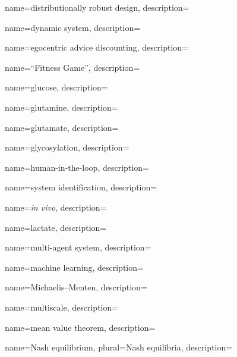 	{
		name={distributionally robust design},
		description={}
	}
	
	{
		name={dynamic system},
		description={}
	}		


	{
		name={egocentric advice discounting},
		description={}
	}


	{
		name={``Fitness Game''},
		description={}
	}


	{
		name={glucose},
		description={}
	}
	
	{
		name={glutamine},
		description={}
	}	
	
	{
		name={glutamate},
		description={}
	}		


	{
		name={glycosylation},
		description={}
	}	


	{
		name={human-in-the-loop},
		description={}
	}
	

	{
		name={system identification},
		description={}
	}

	{
		name={\textit{in vivo}},		
		description={}
	}
	

	{
		name={lactate},
		description={}
	}	
	

	{
		name={multi-agent system},
		description={}
	}	


	{
		name={machine learning},
		description={}
	}	

	{
		name={Michaelis--Menten},
		description={}
	}		


	{
		name={multiscale},
		description={}
	}		


	{
		name={mean value theorem},
		description={}
	}		
	

	{
		name={Nash equilibrium},
		plural={Nash equilibria},
		description={}
	}
	
